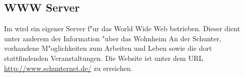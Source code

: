 
\subsection{WWW Server}

Im \snev wird ein eigener \glossar Server f"ur das \glossar World Wide Web
betrieben. Dieser dient unter anderem der Information "uber das Wohnheim An der
Schunter, vorhandene M"oglichkeiten zum Arbeiten und Leben sowie die dort
stattfindenden Veranstaltungen. Die Website ist unter dem URL 
\url{http://www.schunternet.de/} zu erreichen. 



